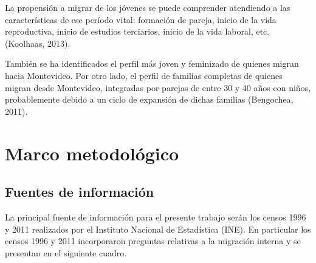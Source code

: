 \documentclass[12pt,spanish,]{article}
\begin{document}
La propensión a migrar de los jóvenes se puede comprender atendiendo a
las características de ese período vital: formación de pareja, inicio de
la vida reproductiva, inicio de estudios terciarios, inicio de la vida
laboral, etc. (Koolhaas, 2013).

También se ha identificados el perfil más joven y feminizado de quienes
migran hacia Montevideo. Por otro lado, el perfil de familias completas
de quienes migran desde Montevideo, integradas por parejas de entre 30 y
40 años con niños, probablemente debido a un ciclo de expansión de
dichas familias (Bengochea, 2011).

\newpage

\hypertarget{marco-metodoluxf3gico}{%
\section{Marco metodológico}\label{marco-metodoluxf3gico}}

\hypertarget{fuentes-de-informaciuxf3n}{%
\subsection{Fuentes de información}\label{fuentes-de-informaciuxf3n}}

La principal fuente de información para el presente trabajo serán los
censos 1996 y 2011 realizados por el Instituto Nacional de Estadística
(INE). En particular los censos 1996 y 2011 incorporaron preguntas
relativas a la migración interna y se presentan en el siguiente cuadro.
\end{document}
